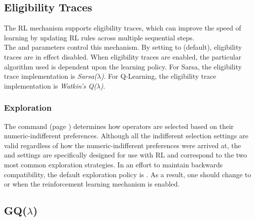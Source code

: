 \subsection{Eligibility Traces}
\label{RL-et}

The RL mechanism supports eligibility traces, which can improve the speed of learning by
updating RL rules across multiple sequential steps. \\
The  and  parameters control this mechanism.
By setting  to  (default), eligibility traces are in effect disabled.
When eligibility traces are enabled, the particular algorithm used is dependent upon the learning policy.
For Sarsa, the eligibility trace implementation is \emph{Sarsa($\lambda$)}.
For Q-Learning, the eligibility trace implementation is \emph{Watkin's Q($\lambda$)}.

\subsubsection{Exploration}

The  command (page \pageref{decide-indifferent-selection}) determines how operators are selected based on their numeric-indifferent preferences.
Although all the indifferent selection settings are valid regardless of how the numeric-indifferent preferences were arrived at, the  and  settings are specifically designed for use with RL and correspond to the two most common exploration strategies.
In an effort to maintain backwards compatibility, the default exploration policy is .
As a result, one should change to  or  when the reinforcement learning mechanism is enabled.

\subsection{\texorpdfstring{GQ($\lambda$)}{GQ(lambda)}}

